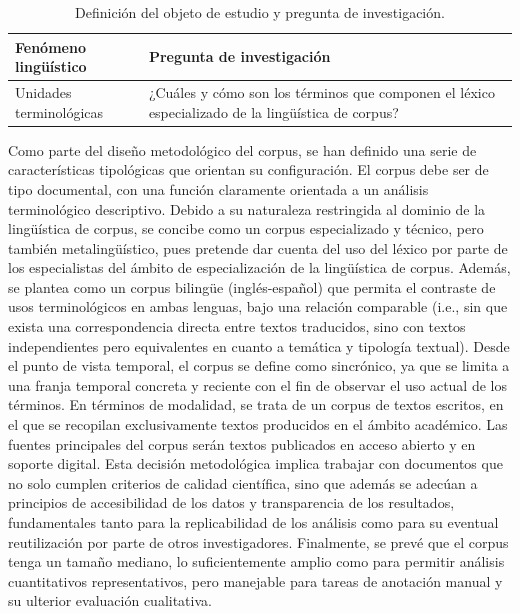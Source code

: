\begin{table}[H]
\centering
\fontsize{10}{12}\selectfont
\begin{tabular}{@{}p{4.5cm}p{9cm}@{}}
\toprule
\textbf {Fenómeno lingüístico} & \textbf {Pregunta de investigación} \\
\midrule
{Unidades terminológicas} & ¿Cuáles y cómo son los términos que componen el léxico especializado de la lingüística de corpus? \\
\bottomrule
\end{tabular}
\caption{Definición del objeto de estudio y pregunta de investigación.}
\label{tab:fenomeno-pregunta}
\end{table}

Como parte del diseño metodológico del corpus, se han definido una serie de características  tipológicas que orientan su configuración. El corpus debe ser de tipo documental, con una función claramente orientada a un análisis terminológico descriptivo. Debido a su naturaleza restringida al dominio de la lingüística de corpus, se concibe como un corpus especializado y técnico, pero también metalingüístico, pues pretende dar cuenta del uso del léxico por parte de los especialistas del ámbito de especialización de la lingüística de corpus. Además, se plantea como un corpus bilingüe (inglés-español) que permita el contraste de usos terminológicos en ambas lenguas, bajo una relación comparable (i.e., sin que exista una correspondencia directa entre textos traducidos, sino con textos independientes pero equivalentes en cuanto a temática y tipología textual). Desde el punto de vista temporal, el corpus se define como sincrónico, ya que se limita a una franja temporal concreta y reciente con el fin de observar el uso actual de los términos. En términos de modalidad, se trata de un corpus de textos escritos, en el que se recopilan exclusivamente textos producidos en el ámbito académico. Las fuentes principales del corpus serán textos publicados en acceso abierto y en soporte digital. Esta decisión metodológica implica trabajar con documentos que no solo cumplen criterios de calidad científica, sino que además se adecúan a principios de accesibilidad de los datos y transparencia de los resultados, fundamentales tanto para la replicabilidad de los análisis como para su eventual reutilización por parte de otros investigadores. Finalmente, se prevé que el corpus tenga un tamaño mediano, lo suficientemente amplio como para permitir análisis cuantitativos representativos, pero manejable para tareas de anotación manual y su ulterior evaluación cualitativa.

